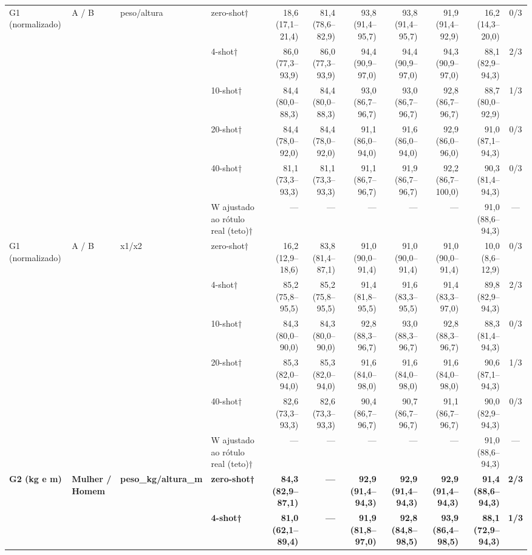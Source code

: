 \begin{table}[htbp]
\begin{tabular}{llllrrrrrrc}
\midrule
G1 (normalizado) & A / B & peso/altura & zero-shot† & 18,6 (17,1–21,4) & 81,4 (78,6–82,9) & 93,8 (91,4–95,7) & 93,8 (91,4–95,7) & 91,9 (91,4–92,9) & 16,2 (14,3–20,0) & 0/3 \\
 &  &  & 4-shot† & 86,0 (77,3–93,9) & 86,0 (77,3–93,9) & 94,4 (90,9–97,0) & 94,4 (90,9–97,0) & 94,3 (90,9–97,0) & 88,1 (82,9–94,3) & 2/3 \\
 &  &  & 10-shot† & 84,4 (80,0–88,3) & 84,4 (80,0–88,3) & 93,0 (86,7–96,7) & 93,0 (86,7–96,7) & 92,8 (86,7–96,7) & 88,7 (80,0–92,9) & 1/3 \\
 &  &  & 20-shot† & 84,4 (78,0–92,0) & 84,4 (78,0–92,0) & 91,1 (86,0–94,0) & 91,6 (86,0–94,0) & 92,9 (86,0–96,0) & 91,0 (87,1–94,3) & 0/3 \\
 &  &  & 40-shot† & 81,1 (73,3–93,3) & 81,1 (73,3–93,3) & 91,1 (86,7–96,7) & 91,9 (86,7–96,7) & 92,2 (86,7–100,0) & 90,3 (81,4–94,3) & 0/3 \\
 &  &  & W ajustado ao rótulo real (teto)† & — & — & — & — & — & 91,0 (88,6–94,3) & — \\
\midrule
G1 (normalizado) & A / B & x1/x2 & zero-shot† & 16,2 (12,9–18,6) & 83,8 (81,4–87,1) & 91,0 (90,0–91,4) & 91,0 (90,0–91,4) & 91,0 (90,0–91,4) & 10,0 (8,6–12,9) & 0/3 \\
 &  &  & 4-shot† & 85,2 (75,8–95,5) & 85,2 (75,8–95,5) & 91,4 (81,8–95,5) & 91,6 (83,3–95,5) & 91,4 (83,3–97,0) & 89,8 (82,9–94,3) & 2/3 \\
 &  &  & 10-shot† & 84,3 (80,0–90,0) & 84,3 (80,0–90,0) & 92,8 (88,3–96,7) & 93,0 (88,3–96,7) & 92,8 (88,3–96,7) & 88,3 (81,4–94,3) & 0/3 \\
 &  &  & 20-shot† & 85,3 (82,0–94,0) & 85,3 (82,0–94,0) & 91,6 (84,0–98,0) & 91,6 (84,0–98,0) & 91,6 (84,0–98,0) & 90,6 (87,1–94,3) & 1/3 \\
 &  &  & 40-shot† & 82,6 (73,3–93,3) & 82,6 (73,3–93,3) & 90,4 (86,7–96,7) & 90,7 (86,7–96,7) & 91,1 (86,7–96,7) & 90,0 (82,9–94,3) & 0/3 \\
 &  &  & W ajustado ao rótulo real (teto)† & — & — & — & — & — & 91,0 (88,6–94,3) & — \\
\midrule
\textbf{G2 (kg e m)} & \textbf{Mulher / Homem} & \textbf{peso\_kg/altura\_m} & \textbf{zero-shot†} & \textbf{84,3 (82,9–87,1)} & \textbf{—} & \textbf{92,9 (91,4–94,3)} & \textbf{92,9 (91,4–94,3)} & \textbf{92,9 (91,4–94,3)} & \textbf{91,4 (88,6–94,3)} & \textbf{2/3} \\
 &  &  & \textbf{4-shot†} & \textbf{81,0 (62,1–89,4)} & \textbf{—} & \textbf{91,9 (81,8–97,0)} & \textbf{92,8 (84,8–98,5)} & \textbf{93,9 (86,4–98,5)} & \textbf{88,1 (72,9–94,3)} & \textbf{1/3} \\

\end{tabular}
\end{table}
